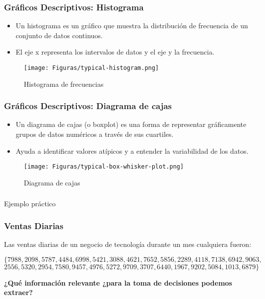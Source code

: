 \documentclass[aspectratio=169]{beamer}
\begin{document}
\begin{frame}
\frametitle{Gráficos Descriptivos: Histograma}

\begin{itemize}
    \item Un histograma es un gráfico que muestra la distribución de frecuencia de un conjunto de datos continuos.
    \item El eje x representa los intervalos de datos y el eje y la frecuencia.
\end{itemize}

\begin{figure}
\texttt{[image: Figuras/typical-histogram.png]}
\caption{Histograma de frecuencias}
\end{figure}

\end{frame}

\begin{frame}
\frametitle{Gráficos Descriptivos: Diagrama de cajas}

\begin{itemize}
    \item Un diagrama de cajas (o boxplot) es una forma de representar gráficamente grupos de datos numéricos a través de sus cuartiles.
    \item Ayuda a identificar valores atípicos y a entender la variabilidad de los datos.
\end{itemize}

\begin{figure}
\texttt{[image: Figuras/typical-box-whisker-plot.png]}
\caption{Diagrama de cajas}
\end{figure}

\end{frame}



\begin{frame}
\frametitle{}
\begin{center}
\Huge Ejemplo práctico
\end{center}
\end{frame}





\begin{frame}
\frametitle{Ventas Diarias}
Las ventas diarias de un negocio de tecnología durante un mes cualquiera fueron:

{\small 
$$
\{7988, 2098, 5787, 4484, 6998, 5421, 3088, 4621, 7652, 5856, 2289, 4118, 7138, 6942, 9063,$$
$$2556, 5320, 2954, 7580, 9457, 4976, 5272, 9709, 3707,6440, 1967, 9202, 5084, 1013, 6879\}
$$
}

\vfill

\begin{center}
{\bf
¿Qué información relevante ¿para la toma de decisiones podemos extraer?}
    
\end{center}

\end{frame}
\end{document}
